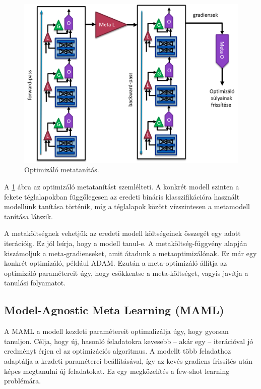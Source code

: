 \begin{figure}[!ht]
	\centering
	\includegraphics[width=120mm, keepaspectratio]{figures/meta-opt.png}
	\caption{Optimizáló metatanítás.}
	\label{fig:meta-opt}
\end{figure}

A \ref{fig:meta-opt} ábra az optimizáló metatanítást szemlélteti. A konkrét modell szinten  a fekete téglalapokban függőlegesen az eredeti bináris klasszifikációra használt modellünk tanítása történik, míg a téglalapok között vízszintesen a metamodell tanítása látszik.

A metaköltségnek vehetjük az eredeti modell költségeinek összegét egy adott iterációig. Ez jól leírja, hogy a modell tanul-e. A metaköltség-függvény alapján kiszámoljuk a meta-gradienseket, amit átadunk a metaoptimizálónak. Ez már egy konkrét optimizáló, például ADAM. Ezután a meta-optimizáló állítja az optimizáló paramétereit úgy, hogy csökkentse a meta-költséget, vagyis javítja a tanulási folyamatot. 

\subsection{Model-Agnostic Meta Learning (MAML)}


A MAML a modell kezdeti paramétereit optimalizálja úgy, hogy gyorsan tanuljon. Célja, hogy új, hasonló feladatokra kevesebb -- akár egy -- iterációval jó eredményt érjen el az optimizációs algoritmus. A modellt több feladathoz adaptálja a kezdeti paraméterei beállításával, így az kevés gradiens frissítés után képes megtanulni új feladatokat. Ez egy megközelítés a few-shot learning problémára.



